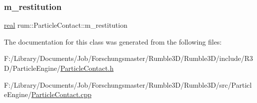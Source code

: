 \subsubsection{\texorpdfstring{m\+\_\+restitution}{m\_restitution}}
{\footnotesize\ttfamily \hyperlink{namespacerum_a7e8cca23573d5eaead0f138cbaa4862c}{real} rum\+::\+Particle\+Contact\+::m\+\_\+restitution}



The documentation for this class was generated from the following files\+:\begin{DoxyCompactItemize}
\item 
F\+:/\+Library/\+Documents/\+Job/\+Forschungsmaster/\+Rumble3\+D/\+Rumble3\+D/include/\+R3\+D/\+Particle\+Engine/\hyperlink{_particle_contact_8h}{Particle\+Contact.\+h}\item 
F\+:/\+Library/\+Documents/\+Job/\+Forschungsmaster/\+Rumble3\+D/\+Rumble3\+D/src/\+Particle\+Engine/\hyperlink{_particle_contact_8cpp}{Particle\+Contact.\+cpp}\end{DoxyCompactItemize}
